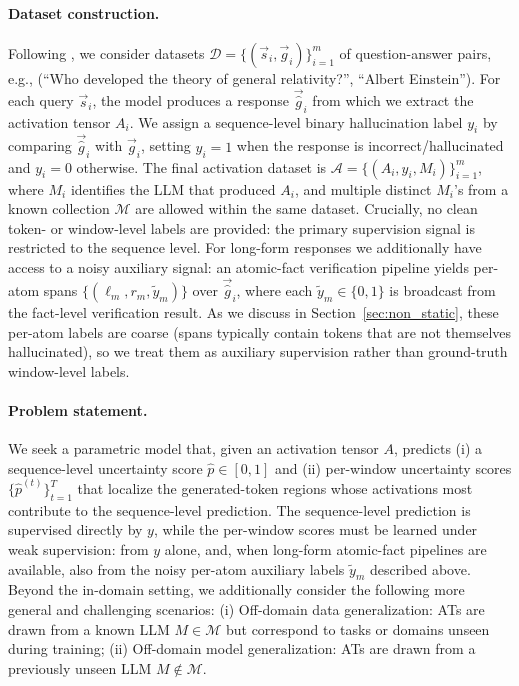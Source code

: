 \paragraph{Dataset construction.} Following \citet{orgad2024}, we consider
datasets $\mathcal{D} = \{(\vec{s}_i, \vec{g}_i)\}_{i=1}^m$ of
question-answer pairs, e.g., (``Who developed the theory of general
relativity?'', ``Albert Einstein''). For each query $\vec{s}_i$, the model
produces a response $\vec{\hat{g}}_i$ from which we extract the activation
tensor $A_i$. We assign a sequence-level binary hallucination label $y_i$
by comparing $\vec{\hat{g}}_i$ with $\vec{g}_i$, setting $y_i = 1$ when the
response is incorrect/hallucinated and $y_i = 0$ otherwise. The final
activation dataset is $\mathcal{A} = \{(A_i, y_i, M_i)\}_{i=1}^m$, where
$M_i$ identifies the LLM that produced $A_i$, and multiple distinct $M_i$'s
from a known collection $\mathcal{M}$ are allowed within the same dataset.
Crucially, no clean token- or window-level labels are provided:
the primary supervision signal is restricted to the sequence level. For
long-form responses we additionally have access to a noisy auxiliary
signal: an atomic-fact verification pipeline yields per-atom spans
$\{(\ell_m, r_m, \tilde{y}_m)\}$ over $\vec{\hat{g}}_i$, where each
$\tilde{y}_m \in \{0, 1\}$ is broadcast from the fact-level
verification result. As we discuss in
Section~\ref{sec:non_static}, these per-atom labels are coarse (spans
typically contain tokens that are not themselves hallucinated), so we
treat them as auxiliary supervision rather than ground-truth
window-level labels.

\paragraph{Problem statement.} We seek a parametric model that, given an
activation tensor $A$, predicts (i) a sequence-level uncertainty score
$\hat{p} \in [0, 1]$ and (ii) per-window uncertainty scores
$\{\hat{p}^{(t)}\}_{t=1}^{T}$ that localize the generated-token regions
whose activations most contribute to the sequence-level prediction. The
sequence-level prediction is supervised directly by $y$, while the
per-window scores must be learned under weak supervision: from
$y$ alone, and, when long-form atomic-fact pipelines are available,
also from the noisy per-atom auxiliary labels $\tilde{y}_m$ described
above. Beyond the in-domain setting, we additionally consider
the following more general and challenging scenarios: (i) Off-domain data
generalization: ATs are drawn from a known LLM $M \in \mathcal{M}$ but
correspond to tasks or domains unseen during training; (ii) Off-domain
model generalization: ATs are drawn from a previously unseen LLM
$M \notin \mathcal{M}$.
